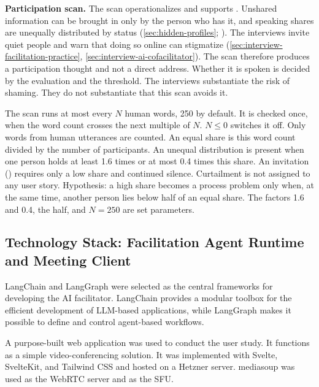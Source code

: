 \label{sec:participation-scan}
\textbf{Participation scan.}
The scan operationalizes  and supports .
Unshared information can be brought in only by the person who has it, and speaking shares are unequally
distributed by status
(\autoref{sec:hidden-profiles};
\cite{stasserExpertRolesInformation1995,bakerEnhancingGroupDecision2010}).
The interviews invite quiet people and warn that doing so online can stigmatize
(\autoref{sec:interview-facilitation-practice}, \autoref{sec:interview-ai-cofacilitator}).
The scan therefore produces a participation thought and not a direct address.
Whether it is spoken is decided by the evaluation and the threshold.
The interviews substantiate the risk of shaming.
They do not substantiate that this scan avoids it.

The scan runs at most every \(N\) human words, 250 by default.
It is checked once, when the word count crosses the next multiple of \(N\).
\(N \le 0\) switches it off.
Only words from human utterances are counted.
An equal share is this word count divided by the number of participants.
An unequal distribution is present when one person holds at least 1.6 times or at most 0.4 times
this share.
An invitation () requires only a low share and continued silence.
Curtailment is not assigned to any user story.
Hypothesis: a high share becomes a process problem only when, at the same time, another person lies below
half of an equal share.
The factors 1.6 and 0.4, the half, and \(N = 250\) are set parameters.

\subsection{Technology Stack: Facilitation Agent Runtime and Meeting Client}

LangChain and LangGraph were selected as the central frameworks for developing the AI facilitator.
LangChain provides a modular toolbox for the efficient development of LLM-based
applications, while LangGraph makes it possible to define and control agent-based workflows.

A purpose-built web application was used to conduct the user study. It functions as a simple
video-conferencing solution. It was implemented with Svelte, SvelteKit, and Tailwind CSS and hosted on a
Hetzner server. mediasoup was used as the WebRTC server and as the SFU.

